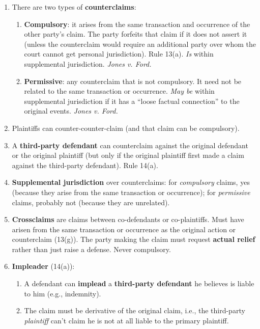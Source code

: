 \begin{enumerate}
    \item There are two types of \textbf{counterclaims}:
    \begin{enumerate}
        \item \textbf{Compulsory}: it arises from the same transaction and 
        occurrence of the other party's claim. The party forfeits that claim 
        if it does not assert it (unless the counterclaim would require an 
        additional party over whom the court cannot get personal 
        jurisdiction). Rule 13(a). \emph{Is} within supplemental jurisdiction. 
        \emph{Jones v. Ford.}
        \item \textbf{Permissive}: any counterclaim that is not compulsory. It 
        need not be related to the same transaction or occurrence. \emph{May 
        be} within supplemental jurisdiction if it has a ``loose factual 
        connection'' to the original events. \emph{Jones v. Ford.}
    \end{enumerate}
    \item Plaintiffs can counter-counter-claim (and that claim can be 
    compulsory).
    \item A \textbf{third-party defendant} can counterclaim against the 
    original defendant or the original plaintiff (but only if the original 
    plaintiff first made a claim against the third-party defendant). Rule 
    14(a).
    \item \textbf{Supplemental jurisdiction} over counterclaims: for 
    \emph{compulsory} claims, yes (because they arise from the same 
    transaction or occurrence); for \emph{permissive} claims, probably not 
    (because they are unrelated).
    \item \textbf{Crossclaims} are claims between co-defendants or 
    co-plaintiffs. Must have arisen from the same transaction or occurrence as 
    the original action or counterclaim (13(g)). The party making the claim 
    must request \textbf{actual relief} rather than just raise a defense. 
    Never compulsory.
    \item \textbf{Impleader} (14(a)):
    \begin{enumerate}
        \item A defendant can \textbf{implead} a \textbf{third-party 
        defendant} he believes is liable to him (e.g., indemnity).
        \item The claim must be derivative of the original claim, i.e., the 
        third-party \emph{plaintiff} can't claim he is not at all liable to 
        the primary plaintiff.

\end{enumerate}
\end{enumerate}
